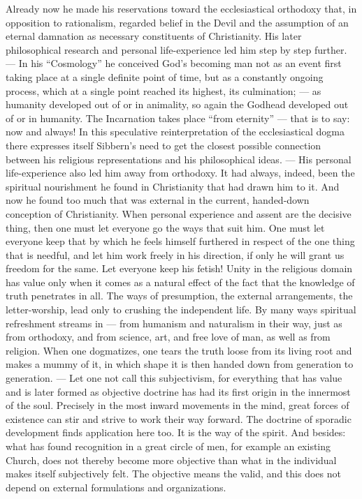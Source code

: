 \documentclass[12pt,a4paper]{book}
\newcommand{\opage}[1]{\marginnote{\footnotesize\textit{[#1]}}}
\begin{document}
Already now he made his reservations toward the ecclesiastical orthodoxy that, in opposition
to rationalism, regarded belief in the Devil and the assumption of an eternal damnation as
necessary constituents of Christianity. His later philosophical research and personal
life-experience led him step by step further. --- In his ``Cosmology'' he conceived God's
becoming man not as an event first taking place at a single definite point of time, but as a
constantly ongoing process, which at a single point reached its highest, its culmination; ---
as humanity developed out of or in animality, so again the Godhead developed out of or in
humanity. The Incarnation takes place ``\opage{107}from eternity'' --- that is to say: now and always!
In this speculative reinterpretation of the ecclesiastical dogma there expresses itself
Sibbern's need to get the closest possible connection between his religious representations
and his philosophical ideas. --- His personal life-experience also led him away from
orthodoxy. It had always, indeed, been the spiritual nourishment he found in Christianity
that had drawn him to it. And now he found too much that was external in the current,
handed-down conception of Christianity. When personal experience and assent are the decisive
thing, then one must let everyone go the ways that suit him. One must let everyone keep that
by which he feels himself furthered in respect of the one thing that is needful, and let him
work freely in his direction, if only he will grant us freedom for the same. Let everyone
keep his fetish! Unity in the religious domain has value only when it comes as a natural
effect of the fact that the knowledge of truth penetrates in all. The ways of presumption,
the external arrangements, the letter-worship, lead only to crushing the independent life. By
many ways spiritual refreshment streams in --- from humanism and naturalism in their way,
just as from orthodoxy, and from science, art, and free love of man, as well as from
religion. When one dogmatizes, one tears the truth loose from its living root and makes a
mummy of it, in which shape it is then handed down from generation to generation. --- Let one
not call this subjectivism, for everything that has value and is later formed as objective
doctrine has had its first origin in the innermost of the soul. Precisely in the most inward
movements in the mind, great forces of existence can stir and strive to work their way
forward. The doctrine of sporadic development finds application here too. It is the way of the
spirit. And besides: what has found recognition in a great circle of men, for example an
existing Church, does not thereby become more objective than what in the individual makes
itself subjectively felt. The objective means the valid, and this does not depend on external
formulations and organizations.
\end{document}

